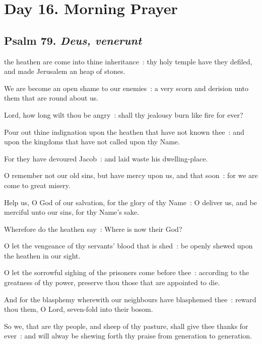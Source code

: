\clearpage
\section*{Day 16. Morning Prayer}

\subsection{Psalm 79. \textit{Deus, venerunt}}

 the heathen are come into thine inheritance~: thy holy temple have they defiled, and made Jerusalem an heap of stones.\par
{}
We are become an open shame to our enemies~: a very scorn and derision unto them that are round about us.\par
{}Lord, how long wilt thou be angry~: shall thy jealousy burn like fire for ever?\par
{}Pour out thine indignation upon the heathen that have not known thee~: and upon the kingdoms that have not called upon thy Name.\par
{}For they have devoured Jacob~: and laid waste his dwelling-place.\par
{}O remember not our old sins, but have mercy upon us, and that soon~: for we are come to great misery.\par
{}Help us, O God of our salvation, for the glory of thy Name~: O deliver us, and be merciful unto our sins, for thy Name's sake.\par
{}Wherefore do the heathen say~: Where is now their God?\par
{}O let the vengeance of thy servants' blood that is shed~: be openly shewed upon the heathen in our sight.\par
{}O let the sorrowful sighing of the prisoners come before thee~: according to the greatness of thy power, preserve thou those that are appointed to die.\par
{}And for the blasphemy wherewith our neighbours have blasphemed thee~: reward thou them, O Lord, seven-fold into their bosom.\par
{}So we, that are thy people, and sheep of thy pasture, shall give thee thanks for ever~: and will alway be shewing forth thy praise from generation to generation.\par

